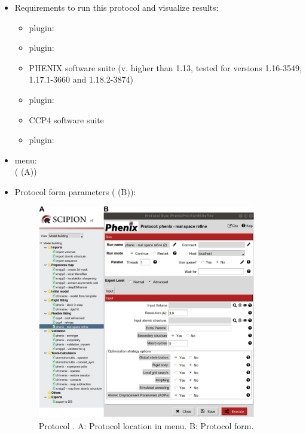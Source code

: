 \begin{itemize}
 \item Requirements to run this protocol and visualize results:
    \begin{itemize}
        \item \scipion plugin: 
        \item \scipion plugin: 
        \item PHENIX software suite (v. higher than 1.13, tested for versions 1.16-3549, 1.17.1-3660 and 1.18.2-3874)
        \item \scipion plugin: 
        \item CCP4 software suite
        \item \scipion plugin: 
    \end{itemize}
 \item \scipion menu:\\
   ( (A))
  
 \item Protocol form parameters ( (B)):
  
    \begin{figure}[H]
     \centering 
     \captionsetup{width=.7\linewidth} 
     \includegraphics[width=0.90\textwidth]{Images_appendix/Fig148.pdf}
     \caption{Protocol . A: Protocol location in \scipion menu. B: Protocol form.}
     \label{fig:app_protocol_real_space_refine_1}
    \end{figure}
    

\end{itemize}

